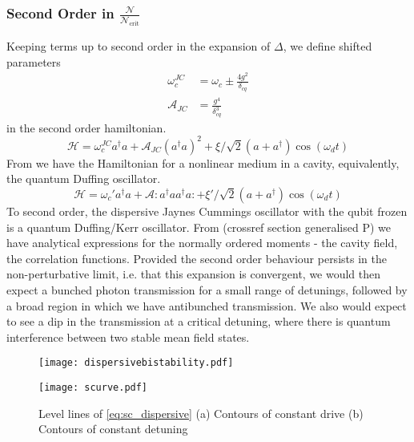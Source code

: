 \subsubsection{Second Order in $\frac{\mathscr{N}}{\mathscr{N}_{\text{crit}}}$}
Keeping terms up to second order in the expansion of $\Delta$, we define shifted parameters
\begin{align*}
    \omega_c^{JC} &= \omega_c \pm \frac{4g^2}{\delta_{cq}}\\
    \mathscr{A}_{JC} &= \frac{g^4}{\delta_{cq}^3}
\end{align*}
in the second order hamiltonian. 
\begin{equation}
    \mathscr{H} = \omega_c^{JC} a ^ \dagger a
    + \mathscr{A}_{JC}\left(a^\dagger a\right)^2
    + \xi/\sqrt{2} ( a + a^\dagger ) \cos(\omega_d t)
\end{equation}
From \cite{Drummond1979} we have the Hamiltonian for a nonlinear medium in a cavity, equivalently, the quantum Duffing oscillator. 
\begin{equation}
    \mathscr{H} = \omega_c' a^\dagger a
    + \mathscr{A} : a ^ \dagger a a ^ \dagger a :
    + \xi'/\sqrt{2}(a+a^\dagger)\cos(\omega_d t)\label{duff}
\end{equation}
To second order, the dispersive Jaynes Cummings oscillator with the qubit frozen is a quantum Duffing/Kerr oscillator. 
From (crossref section generalised P) we have analytical expressions for the normally ordered moments - the cavity field, the correlation functions. 
Provided the second order behaviour persists in the non-perturbative limit, i.e. that this expansion is convergent, we would then expect a bunched photon transmission for a small range of detunings, followed by a broad region in which we have antibunched transmission.
We also would expect to see a dip in the transmission at a critical detuning, where there is quantum interference between two stable mean field states.
\begin{figure*}[pht]
  \centering
  \begin{minipage}{0.5\linewidth}
    \vspace*{-0.5cm}
    \texttt{[image: dispersivebistability.pdf]}
  \end{minipage}%
  \begin{minipage}{0.5\linewidth}
    \texttt{[image: scurve.pdf]}  
  \end{minipage}
  \caption{Level lines of \cref{eq:sc_dispersive} (a) Contours of constant drive (b) Contours of constant detuning}
  \label{scurve}
\end{figure*}
